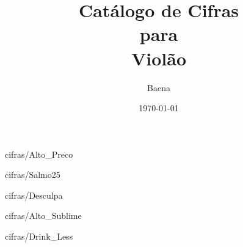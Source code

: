 \documentclass{scrartcl}
\begin{document}
\title{\textbf{\Huge Catálogo de Cifras\\ \vspace{1cm} para\\ \vspace{1cm} Violão}}
\author{Baena}
\date{\today}
\maketitle
\thispagestyle{empty}
\newpage

\setcounter{page}{1}

\begin{multicols}{2}
\tableofcontents
\end{multicols}

\cleardoublepage
{}
\setcounter{page}{1}







{cifras/Alto_Preco}




{cifras/Salmo25}


{cifras/Desculpa}


{cifras/Alto_Sublime}








{cifras/Drink_Less}
\end{document}
